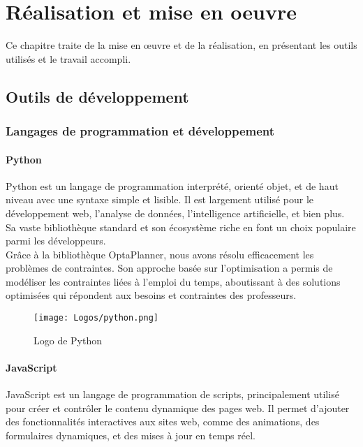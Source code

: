 \chapter{Réalisation et mise en oeuvre}
\label{chap:Réalisation et mise en oeuvre}
Ce chapitre traite de la mise en œuvre et de la réalisation, en présentant les outils utilisés et le travail accompli.
\newpage
\section{Outils de développement}
\subsection{Langages de programmation et développement}
\subsubsection*{Python}
Python est un langage de programmation interprété, orienté objet, et de haut niveau avec une syntaxe simple et lisible. Il est largement utilisé pour le développement web, l'analyse de données, l'intelligence artificielle, et bien plus. Sa vaste bibliothèque standard et son écosystème riche en font un choix populaire parmi les développeurs.\\
Grâce à la bibliothèque  OptaPlanner, nous avons résolu efficacement les problèmes de contraintes. Son approche basée sur l'optimisation a permis de modéliser les contraintes liées à l'emploi du temps, aboutissant à des solutions optimisées qui répondent aux besoins et contraintes des professeurs.
\begin{figure}[h]
      \centering
        \texttt{[image: Logos/python.png]}
        \caption{Logo de Python}
\end{figure}
\newpage
\subsubsection*{JavaScript}
JavaScript est un langage de programmation de scripts, principalement utilisé pour créer et contrôler le contenu dynamique des pages web. Il permet d'ajouter des fonctionnalités interactives aux sites web, comme des animations, des formulaires dynamiques, et des mises à jour en temps réel.\\ %

